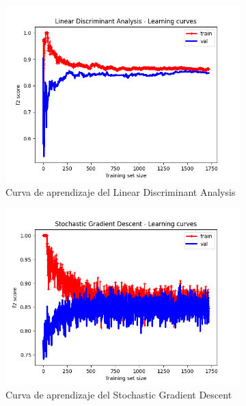 \begin{figure}[!ht]
\begin{subfigure}[b]{0.3\textwidth}
        \includegraphics[width=\linewidth]{media/images/learning-curves/lda.png}
        \caption{Curva de aprendizaje del Linear Discriminant Analysis}
        \label{sfig:lc-lda}
    \end{subfigure}
    \begin{subfigure}[b]{0.3\textwidth}
        \includegraphics[width=\linewidth]{media/images/learning-curves/sgd.png}
        \caption{Curva de aprendizaje del Stochastic Gradient Descent}
        \label{sfig:lc-sgd}
    \end{subfigure}
    \begin{subfigure}[b]{0.3\textwidth}

\end{subfigure}
\end{figure}
